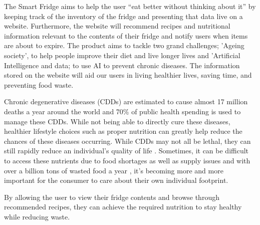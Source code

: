 



The Smart Fridge aims to help the user “eat better without thinking about it” by keeping track of the inventory of the fridge and presenting that data live on a website.
Furthermore, the website will recommend recipes and nutritional information relevant to the contents of their fridge and notify users when items are about to expire.
The product aims to tackle two grand challenges; 'Ageing society', to help people improve their diet and live longer lives and 'Artificial Intelligence and data; to use AI to prevent chronic diseases.
The information stored on the website will aid our users in living healthier lives, saving time, and preventing food waste.  

Chronic degenerative diseases (CDDs) are estimated to cause almost 17 million deaths a year around the world \cite{di_renzo} and 70\% of public health spending is used to manage these CDDs.
While not being able to directly cure these diseases, healthier lifestyle choices such as proper nutrition can greatly help reduce the chances of these diseases occurring.
While CDDs may not all be lethal, they can still rapidly reduce an individual's quality of life \cite{digital_health_2022}.
Sometimes, it can be difficult to access these nutrients due to food shortages as well as supply issues and with over a billion tons of wasted food a year \cite{food_wastage_footprints_2013}, it's becoming more and more important for the consumer to care about their own individual footprint.  

By allowing the user to view their fridge contents and browse through recommended recipes, they can achieve the required nutrition to stay healthy while reducing waste.